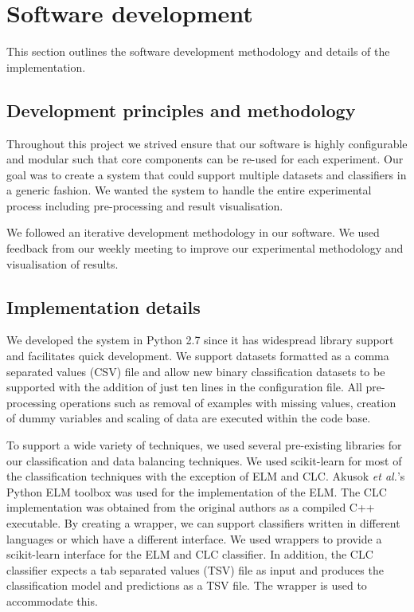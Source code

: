 \documentclass{sig-alternate-05-2015}
\begin{document}
	\section{Software development}
	This section outlines the software development methodology and details of the implementation.
	\subsection{Development principles and methodology}
	Throughout this project we strived ensure that our software is highly configurable and modular such that core components can be re-used for each experiment. Our goal was to create a system that could support multiple datasets and classifiers in a generic fashion. We wanted the system to handle the entire experimental process including pre-processing and result visualisation.
	
	We followed an iterative development methodology in our software. We used feedback from our weekly meeting to improve our experimental methodology and visualisation of results.
	
	\subsection{Implementation details}
	We developed the system in Python 2.7 since it has widespread library support and facilitates quick development. We support datasets formatted as a comma separated values (CSV) file and allow new binary classification datasets to be supported with the addition of just ten lines in the configuration file. All pre-processing operations such as removal of examples with missing values, creation of dummy variables and scaling of data are executed within the code base.
	
	To support a wide variety of techniques, we used several pre-existing libraries for our classification and data balancing techniques. We used scikit-learn \cite{scikit-learn} for most of the classification techniques with the exception of ELM and CLC. Akusok \textit{et al.}'s \cite{7140733} Python ELM toolbox was used for the implementation of the ELM. The CLC implementation was obtained from the original authors \cite{Chen2006} as a compiled C++ executable. By creating a wrapper, we can support classifiers written in different languages or which have a different interface. We used wrappers to provide a scikit-learn interface for the ELM and CLC classifier. In addition, the CLC classifier expects a tab separated values (TSV) file as input and produces the classification model and predictions as a TSV file. The wrapper is used to accommodate this.
	
\end{document}
